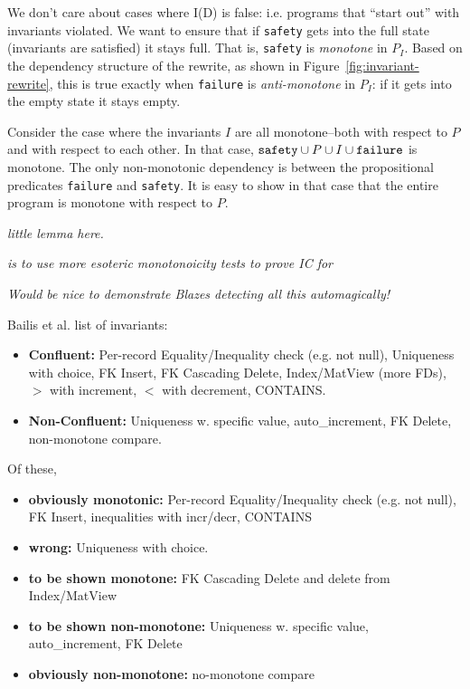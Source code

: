 \documentclass{sig-alternate}
\begin{document}
We don't care about cases where I(D) is false: i.e. programs that ``start out'' with invariants violated.  We want to ensure that if \texttt{safety} gets into the full state (invariants are satisfied) it stays full.  That is, \texttt{safety} is \emph{monotone} in $P_I$.   Based on the dependency structure of the rewrite, as shown in Figure~\ref{fig:invariant-rewrite}, this is true exactly when \texttt{failure} is \emph{anti-monotone} in $P_I$: if it gets into the empty state it stays empty.  

Consider the case where the invariants $I$ are all monotone--both with respect to $P$ and with respect to each other.  In that case, $\mbox{\texttt{safety}} \cup P \cup I \cup \mbox{\texttt{failure}}$ is monotone. The only non-monotonic dependency is between the propositional predicates \texttt{failure} and \texttt{safety}.  It is easy to show in that case that the entire program is monotone with respect to $P$.

\emph{little lemma here.}

\emph{ is to use more esoteric monotonoicity tests to prove IC for }

\emph{Would be nice to demonstrate Blazes detecting all this automagically!}

Bailis et al. list of invariants:
\begin{itemize}
\item {\bf Confluent:} Per-record Equality/Inequality check (e.g. not null), Uniqueness with choice, FK Insert, FK Cascading Delete, Index/MatView (more FDs), $>$ with increment, $<$ with decrement, CONTAINS.
\item {\bf Non-Confluent:} Uniqueness w. specific value, auto\_increment, FK Delete, non-monotone compare.
\end{itemize}

Of these, 
\begin{itemize}
\item {\bf obviously monotonic:} Per-record Equality/Inequality check (e.g. not null), FK Insert, inequalities with incr/decr, CONTAINS
\item {\bf wrong:} Uniqueness with choice.
\item {\bf to be shown monotone:} FK Cascading Delete and delete from Index/MatView
\item {\bf to be shown non-monotone:} Uniqueness w. specific value, auto\_increment, FK Delete
\item {\bf obviously non-monotone:} no-monotone compare
\end{itemize}
\end{document}

